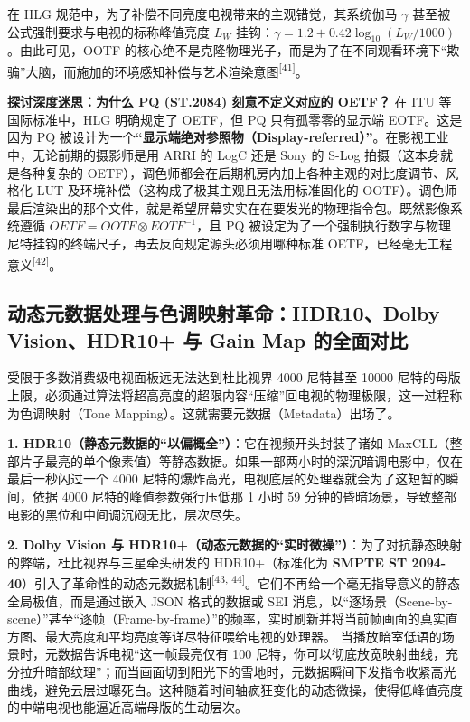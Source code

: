 \documentclass[12pt, a4paper]{ctexart}
\newcommand{\scite}[1]{\textsuperscript{[#1]}}
\begin{document}
在 HLG 规范中，为了补偿不同亮度电视带来的主观错觉，其系统伽马 $\gamma$ 甚至被公式强制要求与电视的标称峰值亮度 $L_W$ 挂钩：$\gamma = 1.2 + 0.42 \log_{10}(L_W / 1000)$。由此可见，OOTF 的核心绝不是克隆物理光子，而是为了在不同观看环境下“欺骗”大脑，而施加的环境感知补偿与艺术渲染意图\scite{41}。

\textbf{探讨深度迷思：为什么 PQ (ST.2084) 刻意不定义对应的 OETF？}
在 ITU 等国际标准中，HLG 明确规定了 OETF，但 PQ 只有孤零零的显示端 EOTF。这是因为 PQ 被设计为一个\textbf{“显示端绝对参照物（Display-referred）”}。在影视工业中，无论前期的摄影师是用 ARRI 的 LogC 还是 Sony 的 S-Log 拍摄（这本身就是各种复杂的 OETF），调色师都会在后期机房内加上各种主观的对比度调节、风格化 LUT 及环境补偿（这构成了极其主观且无法用标准固化的 OOTF）。调色师最后渲染出的那个文件，就是希望屏幕实实在在要发光的物理指令包。既然影像系统遵循 $OETF = OOTF \otimes EOTF^{-1}$，且 PQ 被设定为了一个强制执行数字与物理尼特挂钩的终端尺子，再去反向规定源头必须用哪种标准 OETF，已经毫无工程意义\scite{42}。

\subsection{动态元数据处理与色调映射革命：HDR10、Dolby Vision、HDR10+ 与 Gain Map 的全面对比}

受限于多数消费级电视面板远无法达到杜比视界 4000 尼特甚至 10000 尼特的母版上限，必须通过算法将超高亮度的超限内容“压缩”回电视的物理极限，这一过程称为色调映射（Tone Mapping）。这就需要元数据（Metadata）出场了。

\textbf{1. HDR10（静态元数据的“以偏概全”）}：它在视频开头封装了诸如 MaxCLL（整部片子最亮的单个像素值）等静态数据。如果一部两小时的深沉暗调电影中，仅在最后一秒闪过一个 4000 尼特的爆炸高光，电视底层的处理器就会为了这短暂的瞬间，依据 4000 尼特的峰值参数强行压低那 1 小时 59 分钟的昏暗场景，导致整部电影的黑位和中间调沉闷无比，层次尽失。

\textbf{2. Dolby Vision 与 HDR10+（动态元数据的“实时微操”）}：为了对抗静态映射的弊端，杜比视界与三星牵头研发的 HDR10+（标准化为 \textbf{SMPTE ST 2094-40}）引入了革命性的动态元数据机制\scite{43, 44}。它们不再给一个毫无指导意义的静态全局极值，而是通过嵌入 JSON 格式的数据或 SEI 消息，以“逐场景（Scene-by-scene）”甚至“逐帧（Frame-by-frame）”的频率，实时刷新并将当前帧画面的真实直方图、最大亮度和平均亮度等详尽特征喂给电视的处理器。
当播放暗室低语的场景时，元数据告诉电视“这一帧最亮仅有 100 尼特，你可以彻底放宽映射曲线，充分拉升暗部纹理”；而当画面切到阳光下的雪地时，元数据瞬间下发指令收紧高光曲线，避免云层过曝死白。这种随着时间轴疯狂变化的动态微操，使得低峰值亮度的中端电视也能逼近高端母版的生动层次。
\end{document}
